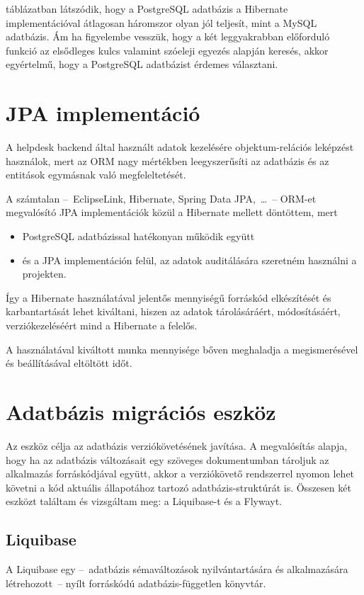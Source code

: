  táblázatban látszódik, hogy a PostgreSQL adatbázis a Hibernate implementációval átlagosan háromszor olyan jól teljesít, mint a MySQL adatbázis. Ám ha figyelembe vesszük, hogy a két leggyakrabban előforduló funkció az elsődleges kulcs valamint szóeleji egyezés alapján keresés, akkor egyértelmű, hogy a PostgreSQL adatbázist érdemes választani.


\section{JPA implementáció}\label{sec:JPA_implementacio_hibernate}
A helpdesk backend által használt adatok kezelésére objektum-relációs leképzést használok, mert az ORM nagy mértékben leegyszerűsíti az adatbázis és az entitások egymásnak való megfeleltetését.


A számtalan --~EclipseLink, Hibernate, Spring Data JPA,~\dots~--   ORM-et megvalósító JPA implementációk közül a Hibernate mellett döntöttem, mert
\begin{itemize}
	\item PostgreSQL adatbázissal hatékonyan működik együtt
	\item és a JPA implementáción felül, az adatok auditálására szeretném használni a projekten.
\end{itemize}

Így a Hibernate használatával jelentős mennyiségű forráskód elkészítését és karbantartását lehet kiváltani, hiszen az adatok tárolásáráért, módosításáért, verziókezeléséért mind a Hibernate a felelős.

A használatával kiváltott munka mennyisége bőven meghaladja a megismerésével és beállításával eltöltött időt.


\section{Adatbázis migrációs eszköz}
Az eszköz célja az adatbázis verziókövetésének javítása. A megvalósítás alapja, hogy ha az adatbázis változásait egy szöveges dokumentumban tároljuk az alkalmazás forráskódjával együtt, akkor a verziókövető rendszerrel nyomon lehet követni a kód aktuális állapotához tartozó adatbázis-struktúrát is. Összesen két eszközt találtam és vizsgáltam meg: a Liquibase-t és a Flywayt.

\subsection{Liquibase}
A Liquibase egy --~adatbázis sémaváltozások nyilvántartására és alkalmazására létrehozott~--   nyílt forráskódú adatbázis-független könyvtár.
	
